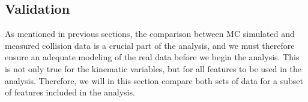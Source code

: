 \subsection*{Validation}\label{subsec:Validation}
As mentioned in previous sections, the comparison between \ac{MC} simulated and measured collision data is a crucial part of the 
analysis, and we must therefore ensure an adequate modeling of the real data before we begin the analysis. This is not only 
true for the kinematic variables, but for all features to be used in the analysis. Therefore, 
we will in this section compare both sets of data for a subset of features included in the analysis.
\begin{figure}[H]
    \renewcommand\figurename{Table}
    \centering
\end{figure}
